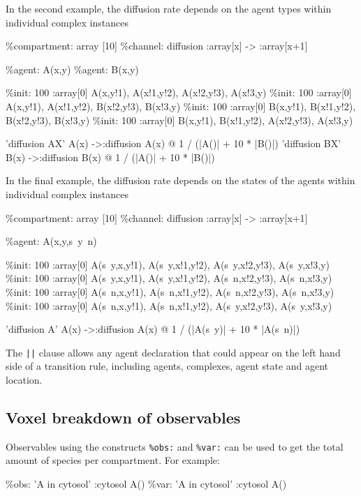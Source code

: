 \documentclass[english]{report}
\begin{document}
In the second example, the diffusion rate depends on the agent types within individual complex instances

\begin{kappasource}
\%compartment: array [10]
\%channel: diffusion :array[x] -> :array[x+1]

\%agent: A(x,y)
\%agent: B(x,y)

\%init: 100 :array[0] A(x,y!1), A(x!1,y!2), A(x!2,y!3), A(x!3,y)
\%init: 100 :array[0] A(x,y!1), A(x!1,y!2), B(x!2,y!3), B(x!3,y)
\%init: 100 :array[0] B(x,y!1), B(x!1,y!2), B(x!2,y!3), B(x!3,y)
\%init: 100 :array[0] B(x,y!1), B(x!1,y!2), A(x!2,y!3), A(x!3,y)

'diffusion AX' A(x) ->:diffusion A(x) @ 1 / (|A()| + 10 * |B()|)
'diffusion BX' B(x) ->:diffusion B(x) @ 1 / (|A()| + 10 * |B()|)
\end{kappasource}

In the final example, the diffusion rate depends on the states of the agents within individual complex instances

\begin{kappasource}
\%compartment: array [10]
\%channel: diffusion :array[x] -> :array[x+1]

\%agent: A(x,y,s~y~n)

\%init: 100 :array[0] A(s~y,x,y!1), A(s~y,x!1,y!2), A(s~y,x!2,y!3), A(s~y,x!3,y)
\%init: 100 :array[0] A(s~y,x,y!1), A(s~y,x!1,y!2), A(s~n,x!2,y!3), A(s~n,x!3,y)
\%init: 100 :array[0] A(s~n,x,y!1), A(s~n,x!1,y!2), A(s~n,x!2,y!3), A(s~n,x!3,y)
\%init: 100 :array[0] A(s~n,x,y!1), A(s~n,x!1,y!2), A(s~y,x!2,y!3), A(s~y,x!3,y)

'diffusion A' A(x) ->:diffusion A(x) @ 1 / (|A(s~y)| + 10 * |A(s~n)|)
\end{kappasource}

The \Verb+||+ clause allows any agent declaration that could appear on the left hand side of a transition rule, including agents, complexes, agent state and agent location.

\subsection{Voxel breakdown of observables}

Observables using the constructs \verb|%obs:| and \verb|%var:| can be used to get the total amount of species per compartment. For example:

\begin{kappasource}
\%obs: 'A in cytosol' :cytosol A()
\%var: 'A in cytosol' :cytosol A()
\end{kappasource}
\end{document}
